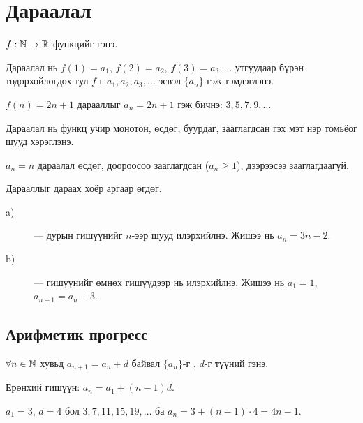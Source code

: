 \section{Дараалал}
\begin{definition}
$f:\mathbb{N}\to\mathbb{R}$ функцийг  гэнэ.
\end{definition}
Дараалал нь $f(1)=a_1$, $f(2)=a_2$, $f(3)=a_3,\ldots$ утгуудаар бүрэн тодорхойлогдох тул
$f$-г $a_1,a_2,a_3,\ldots$ эсвэл $\{a_n\}$ гэж тэмдэглэнэ.

\begin{example}
$f(n)=2n+1$ дарааллыг $a_n=2n+1$ гэж бичнэ: $3,5,7,9,\ldots$
\end{example}

 Дараалал нь функц учир монотон, өсдөг, буурдаг, зааглагдсан гэх мэт
нэр томьёог шууд хэрэглэнэ.

\begin{example}
$a_n=n$ дараалал өсдөг, доороосоо зааглагдсан ($a_n\ge1$), дээрээсээ зааглагдаагүй.
\end{example}

Дарааллыг дараах хоёр аргаар өгдөг.
\begin{description}
  \item[a)]  — дурын гишүүнийг $n$-ээр шууд илэрхийлнэ.
            Жишээ нь $a_n=3n-2$.
  \item[b)]  — гишүүнийг өмнөх гишүүдээр нь илэрхийлнэ.
            Жишээ нь $a_1=1$, $a_{n+1}=a_n+3$.
\end{description}

\subsection{Арифметик прогресс}
\begin{definition}
$\forall n\in\mathbb{N}$ хувьд $a_{n+1}=a_n+d$ байвал $\{a_n\}$-г ,
$d$-г түүний  гэнэ.
\end{definition}

Ерөнхий гишүүн: $a_n=a_1+(n-1)d$.

\begin{example}
$a_1=3$, $d=4$ бол $3,7,11,15,19,\ldots$ ба $a_n=3+(n-1)\cdot4=4n-1$.
\end{example}

